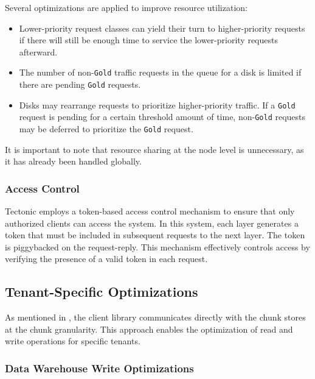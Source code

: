 Several optimizations are applied to improve resource utilization:

\begin{itemize}
    \item Lower-priority request classes can yield their turn to higher-priority requests if there will still be enough time to service the lower-priority requests afterward.
    \item The number of non-\texttt{Gold} traffic requests in the queue for a disk is limited if there are pending \texttt{Gold} requests.
    \item Disks may rearrange requests to prioritize higher-priority traffic. If a \texttt{Gold} request is pending for a certain threshold amount of time, non-\texttt{Gold} requests may be deferred to prioritize the \texttt{Gold} request.
\end{itemize}

It is important to note that resource sharing at the node level is unnecessary, as it has already been handled globally.

\subsubsection{Access Control}\label{sec:access_control}

Tectonic employs a token-based access control mechanism to ensure that only authorized clients can access the system. In this system, each layer generates a token that must be included in subsequent requests to the next layer. The token is piggybacked on the request-reply. This mechanism effectively controls access by verifying the presence of a valid token in each request.

\subsection{Tenant-Specific Optimizations}\label{sec:tenant_specific_optimizations}

As mentioned in , the client library communicates directly with the chunk stores at the chunk granularity. This approach enables the optimization of read and write operations for specific tenants.

\subsubsection{Data Warehouse Write Optimizations}\label{sec:data_warehouse_optimization}

